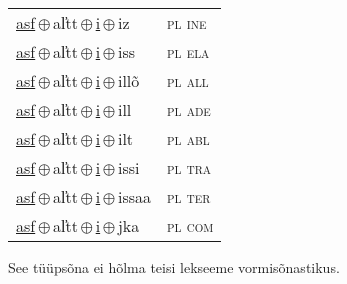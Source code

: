 \begin{minipage}{\textwidth}
\begin{sideways}
\begin{tabular}{l l}
\underline{asf}\,$\oplus$\,al̕tt\,$\oplus$\,\underline{i}\,$\oplus$\,iz & \textsc{ pl ine } \\
\underline{asf}\,$\oplus$\,al̕tt\,$\oplus$\,\underline{i}\,$\oplus$\,iss & \textsc{ pl ela } \\
\underline{asf}\,$\oplus$\,al̕tt\,$\oplus$\,\underline{i}\,$\oplus$\,illõ & \textsc{ pl all } \\
\underline{asf}\,$\oplus$\,al̕tt\,$\oplus$\,\underline{i}\,$\oplus$\,ill & \textsc{ pl ade } \\
\underline{asf}\,$\oplus$\,al̕tt\,$\oplus$\,\underline{i}\,$\oplus$\,ilt & \textsc{ pl abl } \\
\underline{asf}\,$\oplus$\,al̕tt\,$\oplus$\,\underline{i}\,$\oplus$\,issi & \textsc{ pl tra } \\
\underline{asf}\,$\oplus$\,al̕tt\,$\oplus$\,\underline{i}\,$\oplus$\,issaa & \textsc{ pl ter } \\
\underline{asf}\,$\oplus$\,al̕tt\,$\oplus$\,\underline{i}\,$\oplus$\,jka & \textsc{ pl com } \\
\end{tabular}
\end{sideways}
\label{tab:tüüpsõnamall-asfi}

\end{minipage}

 
\vspace{1em}
\noindent See tüüpsõna ei hõlma teisi lekseeme vormi\-sõnastikus.
